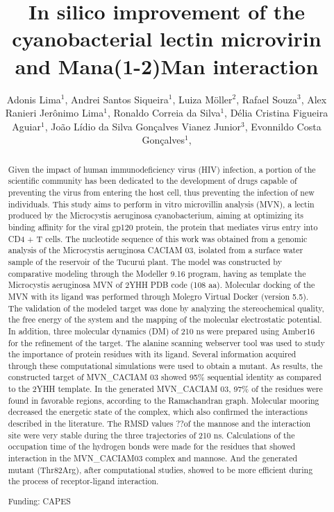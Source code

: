 \documentclass[twoside]{article}
\title{\vspace{-15mm}\fontsize{24pt}{10pt}\selectfont\textbf{ In silico improvement of the cyanobacterial lectin microvirin and Mana(1-2)Man interaction }} %
\author{ Adonis Lima$^{1}$, Andrei Santos Siqueira$^{1}$, Luiza Möller$^{2}$, Rafael Souza$^{3}$, Alex Ranieri Jerônimo Lima$^{1}$, Ronaldo Correia da Silva$^{1}$, Délia Cristina Figueira Aguiar$^{1}$, João Lídio da Silva Gonçalves Vianez Junior$^{3}$, Evonnildo Costa Gonçalves$^{1}$, }
\affil{ 1 Universidade Federal do Pará

2 Faculdade Integrada Brasil Amazônia

3 Instituto Evandro Chagas

 }
\date{}
\begin{document}
  
  
  \maketitle %
  
  
  \thispagestyle{fancy} %
  
  
  \begin{abstract}
  Given the impact of human immunodeficiency virus (HIV) infection, a portion of the scientific community has been dedicated to the development of drugs capable of preventing the virus from entering the host cell, thus preventing the infection of new individuals. This study aims to perform in vitro microvillin analysis (MVN), a lectin produced by the Microcystis aeruginosa cyanobacterium, aiming at optimizing its binding affinity for the viral gp120 protein, the protein that mediates virus entry into CD4 + T cells. The nucleotide sequence of this work was obtained from a genomic analysis of the Microcystis aeruginosa CACIAM 03, isolated from a surface water sample of the reservoir of the Tucuru\'{\i} plant. The model was constructed by comparative modeling through the Modeller 9.16 program, having as template the Microcystis aeruginosa MVN of 2YHH PDB code (108 aa). Molecular docking of the MVN with its ligand was performed through Molegro Virtual Docker (version 5.5). The validation of the modeled target was done by analyzing the stereochemical quality, the free energy of the system and the mapping of the molecular electrostatic potential. In addition, three molecular dynamics (DM) of 210 ns were prepared using Amber16 for the refinement of the target. The alanine scanning webserver tool was used to study the importance of protein residues with its ligand. Several information acquired through these computational simulations were used to obtain a mutant. As results, the constructed target of MVN\_CACIAM 03 showed 95\% sequential identity as compared to the 2YHH template. In the generated MVN\_CACIAM 03, 97\% of the residues were found in favorable regions, according to the Ramachandran graph. Molecular mooring decreased the energetic state of the complex, which also confirmed the interactions described in the literature. The RMSD values ??of the mannose and the interaction site were very stable during the three trajectories of 210 ns. Calculations of the occupation time of the hydrogen bonds were made for the residues that showed interaction in the MVN\_CACIAM03 complex and mannose. And the generated mutant (Thr82Arg), after computational studies, showed to be more efficient during the process of receptor-ligand interaction.
  
  Funding: CAPES \\ 
  \end{abstract}
  
\end{document}
